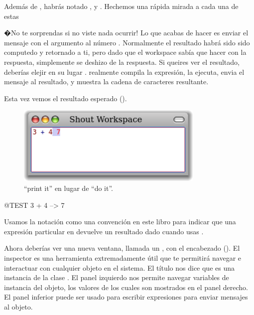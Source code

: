\documentclass[a4paper,10pt,twoside]{book}
\begin{document}

Adem\'as de , habr\'as notado ,  y . Hechemos una r\'apida mirada a cada una de estas


�No te sorprendas si no viste nada ocurrir! Lo que acabas de hacer es enviar el mensaje \ct{+} con el argumento  al n\'umero . Normalmente el resultado  habr\'a sido sido computedo y retornado a ti, pero dado que el workspace sab\'ia que hacer con la respuesta, simplemente se deshizo de la respuesta. Si queires ver el resultado, deber\'ias elejir en su lugar .  realmente compila la expresi\'on, la ejecuta, envia el mensaje  al resultado, y muestra la cadena de caracteres resultante.

Esta vez vemos el resultado esperado ().

\begin{figure}[htb]
\centerline {\includegraphics[width=0.8\textwidth]{PrintIt}}
\caption{``print it'' en lugar de ``do it''. }
\end{figure}

\begin{code}{@TEST}
3 + 4 --> 7
\end{code}
\noindent
Usamos la notaci\'on \ct{-->} como una convenci\'on en este libro para indicar que una expresi\'on particular en \pharo devuelve un resultado dado cuando usas .

\noindent
Ahora deber\'ias ver una nueva ventana, llamada un , con el encabezado  ().
El inspector es una herramienta extremadamente \'util que te permitir\'a navegar e interactuar con cualquier objeto en el sistema.
El t\'itulo nos dice que  es una instancia de la clase .
El panel izquierdo nos permite navegar variables de instancia del objeto, los valores de los cuales son mostrados en el panel derecho.
El panel inferior puede ser usado para escribir expresiones para enviar mensajes al objeto.
\end{document}
